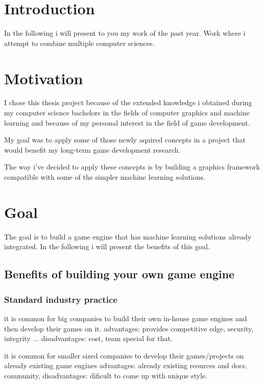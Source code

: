 \chapter{Introduction} 

    In the following i will present to you my work of the past year. Work where i attempt to combine multiple computer sciences. 

\chapter{Motivation}

    I chose this thesis project because of the extended knowledge i obtained during my computer science bachelors in the fields of computer graphics and machine learning and because of my personal interest in the field of game development.

    My goal was to apply some of those newly aquired concepts in a project that would benefit my long-term game development research. 

    The way i've decided to apply these concepts is by building a graphics framework compatible with some of the simpler machine learning solutions.

\chapter{Goal}

    The goal is to build a game engine that has machine learning solutions already integrated. 
    In the following i will present the benefits of this goal.

    \section{Benefits of building your own game engine}
        \subsection{Standard industry practice}
            it is common for big companies to build their own in-house game engines and then develop their games on it.
            advantages:     provides competitive edge, security, integrity ...
            disadvantages:  cost, team special for that.

            it is common for smaller sized companies to develop their games/projects on already existing game engines  
            advantages:     already existing reources and docs, community, 
            disadvantages:  dificult to come up with unique style.

